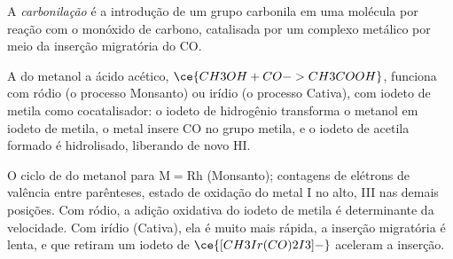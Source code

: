 \begin{definition}[Carbonilação]\label{def:b3:homogeneous-catalysis:carbonylation}
A \emph{carbonilação} é a introdução de um grupo carbonila
em uma molécula por reação com o monóxido de carbono, catalisada por um complexo metálico
por meio da inserção migratória do CO.
\end{definition}

A  do metanol a ácido acético, $\ce{CH3OH + CO -> CH3COOH}$, funciona com
ródio (o processo Monsanto) ou irídio (o processo Cativa), com iodeto de metila
como cocatalisador: o iodeto de hidrogênio transforma o metanol em iodeto de metila, o metal
insere CO no grupo metila, e o iodeto de acetila formado é hidrolisado,
liberando de novo HI.

\begin{omfigure}

{\small O ciclo de  do metanol para $\mathrm M = \mathrm{Rh}$ (Monsanto); contagens de
elétrons de valência entre parênteses, estado de oxidação do metal I no alto, III nas demais posições.
Com ródio, a adição oxidativa do iodeto de metila é determinante da velocidade. Com
irídio (Cativa), ela é muito mais rápida, a inserção migratória é lenta, e
 que retiram um iodeto de $\ce{[CH3Ir(CO)2I3]-}$ aceleram a inserção.}
\end{omfigure}


